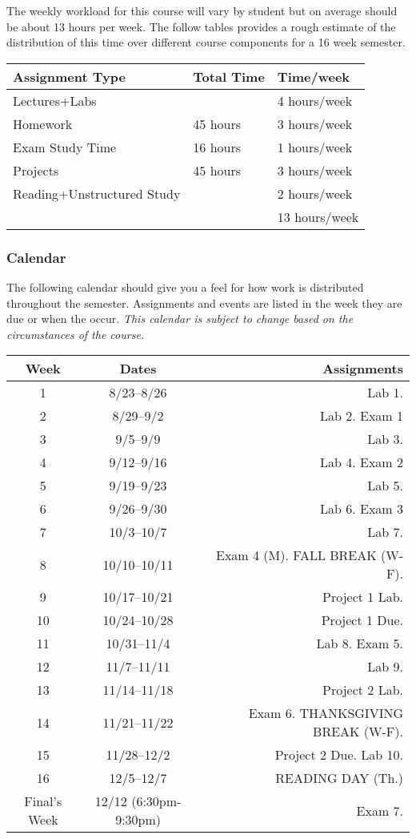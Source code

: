 \documentclass[nobib]{tufte-handout}
\begin{document}
The weekly workload for this course will vary by student but on average should be about 13 hours per week.  The follow tables provides a rough estimate of the distribution of this time over different course components for a 16 week semester.
\begin{center}
\begin{tabular}{lll}
Assignment Type & Total Time & Time/week \\ \toprule
Lectures+Labs &      & 4 hours/week \\
Homework & 45 hours        & 3 hours/week \\
Exam Study Time & 16 hours  & 1 hours/week \\
Projects & 45 hours        & 3 hours/week \\
Reading+Unstructured Study & & 2 hours/week \\
\bottomrule
& & 13 hours/week
\end{tabular}
\end{center}

\subsubsection{Calendar}

The following calendar should give you a feel for how work is distributed throughout the semester.  Assignments and events are listed in the week they are due or when the occur. \textit{This calendar is subject to change based on the circumstances of the course.}

\begin{center}
\begin{tabular}{ccr}
\toprule
Week & Dates & Assignments \\
\toprule
1 & 8/23--8/26 &  Lab 1.\\
2 & 8/29--9/2 &   Lab 2. Exam 1\\
3 & 9/5--9/9 &   Lab 3. \\
4 & 9/12--9/16 &  Lab 4. Exam 2\\
5 & 9/19--9/23 &  Lab 5.\\
6 & 9/26--9/30  &  Lab 6. Exam 3\\
7 & 10/3--10/7 &  Lab 7.\\
8 & 10/10--10/11 & Exam 4 (M).  FALL BREAK (W-F). \\
9 & 10/17--10/21 &  Project 1 Lab. \\
10 & 10/24--10/28 & Project 1 Due. \\
11 & 10/31--11/4 &  Lab 8. Exam 5.\\
12 & 11/7--11/11 & Lab 9. \\
13 & 11/14--11/18 &  Project 2 Lab.\\
14 & 11/21--11/22 &   Exam 6. THANKSGIVING BREAK (W-F).  \\
15 & 11/28--12/2 &  Project 2 Due. Lab 10. \\
16 & 12/5--12/7 &  READING DAY (Th.) \\
\midrule
Final's Week & 12/12 (6:30pm-9:30pm) & Exam 7. \\
\bottomrule
\end{tabular}
\end{center}
\end{document}
